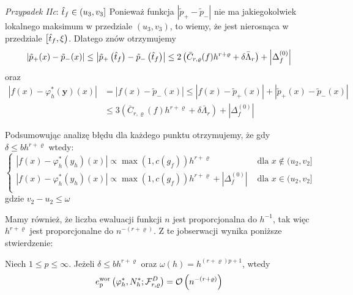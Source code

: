 \documentclass[oik, pdftex, robocza, man]{mgrwms}
\begin{document}
    \textit{Przypadek IIc}: $\hat{t}_{f} \in\left(u_{3}, v_{3}\right]$
    Ponieważ funkcja $\left|\tilde{p}_{+}-\tilde{p}_{-}\right|$ nie ma jakiegokolwiek lokalnego maksimum w przedziale $\left(u_{3}, v_{3}\right)$, to wiemy, że jest nierosnąca w przedziale $\left[\hat{t}_{f}, \xi\right)$. Dlatego znów otrzymujemy
    \begin{equation*}
        \left|\tilde{p}_{+}(x)-\tilde{p}_{-}(x)\right| \leq\left|\tilde{p}_{+}\left(\hat{t}_{f}\right)-\tilde{p}_{-}\left(\hat{t}_{f}\right)\right| \leq 2\left(\bar{C}_{r, \varrho}(f) h^{r+\varrho}+\delta \bar{\Lambda}_{r}\right)+\left|\Delta_{f}^{(0)}\right|
    \end{equation*}
    oraz
    \begin{equation*}
        \begin{aligned}
            \left|f(x)-\varphi_{h}^{*}(\mathbf{y})(x)\right| &=\left|f(x)-\tilde{p}_{-}(x)\right| \leq\left|f(x)-\tilde{p}_{+}(x)\right|+\left|\tilde{p}_{+}(x)-\tilde{p}_{-}(x)\right| \\
            & \leq 3\left(\bar{C}_{r, \varrho}(f) h^{r+\varrho}+\delta \bar{\Lambda}_{r}\right)+\left|\Delta_{f}^{(0)}\right|
        \end{aligned}
    \end{equation*}

    Podsumowując analizę błędu dla każdego punktu otrzymujemy, że gdy $\delta \leq bh^{r+\varrho}$ wtedy:
    \begin{equation*}
        \begin{cases}
            |f(x) - \varphi_{h}^{*}(y_{h})(x)| \propto \max(1, c(g_{f})) h^{r+\varrho} & \text{ dla } x \notin (u_{2}, v_{2}] \\
            |f(x) - \varphi_{h}^{*}(y_{h})(x)| \propto \max(1, c(g_{f})) h^{r+\varrho} + |\Delta_{f}^{(0)}| & \text{ dla } x \in (u_{2}, v_{2}] \\
        \end{cases}
    \end{equation*}
    gdzie $v_{2} - u_{2} \leq \omega$

    Mamy również, że liczba ewaluacji funkcji $n$ jest proporcjonalna do $h^{-1}$, tak więc $h^{r+\varrho}$ jest proporcjonalne do $n^{-(r+\varrho)}$. Z te jobserwacji wynika poniższe stwierdzenie:
    \begin{stw}
        \label{stw2}
        Niech $1 \leq p \leq \infty$. Jeżeli $\delta \leq bh^{r+\varrho}$ oraz $\omega(h) = h^{(r+\varrho)p + 1}$, wtedy
        \begin{equation*}
            e_{\mathrm{p}}^{\mathrm{wor}}\left(\varphi_{h}^{*}, N_{h}^{*} ; \mathcal{F}_{r, \varrho}^{D}\right)=\mathcal{O}\left(n^{-(r+\varrho)}\right)
        \end{equation*}
    \end{stw}
\end{document}
